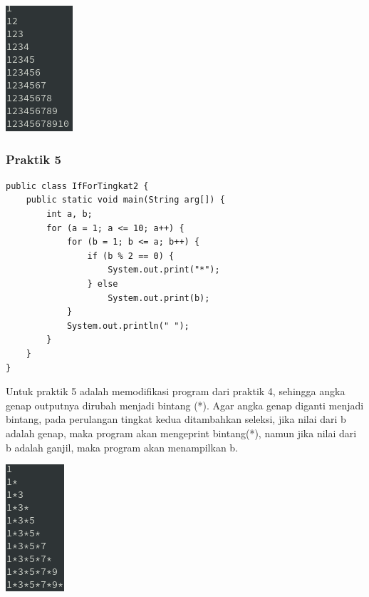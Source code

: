 \documentclass[a4paper,12pt]{article}
\begin{document}
\begin{center}
    \includegraphics[scale=0.8]{4.png} 
\end{center}

\subsubsection{Praktik 5}
\begin{lstlisting}
public class IfForTingkat2 {
    public static void main(String arg[]) {
        int a, b;
        for (a = 1; a <= 10; a++) {
            for (b = 1; b <= a; b++) {
                if (b % 2 == 0) {
                    System.out.print("*");
                } else
                    System.out.print(b);
            }
            System.out.println(" ");
        }
    }
}
\end{lstlisting}
Untuk praktik 5 adalah memodifikasi program dari praktik 4, sehingga angka genap outputnya dirubah menjadi bintang (*).
Agar angka genap diganti menjadi bintang, pada perulangan tingkat kedua ditambahkan seleksi, jika nilai dari b adalah
genap, maka program akan mengeprint bintang(*), namun jika nilai dari b adalah ganjil, maka program akan menampilkan b.

\begin{center}
    \includegraphics[scale=.8]{5.png} 
\end{center}
\end{document}
